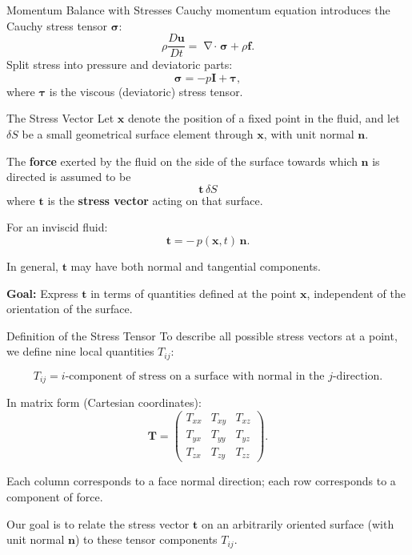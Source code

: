 \documentclass[aspectratio=169]{beamer}
\newcommand{\uu}{\bm{u}}
\newcommand{\I}{\mathbf{I}}
\DeclareMathOperator{\divg}{\nabla\!\cdot}
\begin{document}
\begin{frame}{Momentum Balance with Stresses}
Cauchy momentum equation introduces the Cauchy stress tensor $\bm{\sigma}$:
\[
\rho \frac{D\uu}{Dt} = \divg \bm{\sigma} + \rho \bm{f}.
\]
Split stress into pressure and deviatoric parts:
\[
\bm{\sigma} = -p \I + \bm{\tau},
\]
where $\bm{\tau}$ is the viscous (deviatoric) stress tensor.
\end{frame}


\begin{frame}{The Stress Vector}
\small
Let $\bm{x}$ denote the position of a fixed point in the fluid,
and let $\delta S$ be a small geometrical surface element through $\bm{x}$,
with unit normal $\bm{n}$.

\vspace{0.4cm}

The \textbf{force} exerted by the fluid on the side of the surface
towards which $\bm{n}$ is directed is assumed to be
\[
\boxed{\;\bm{t}\,\delta S\;}
\]
where $\bm{t}$ is the \textbf{stress vector} acting on that surface.

\vspace{0.4cm}

For an inviscid fluid:
\[
\bm{t} = -\,p(\bm{x},t)\,\bm{n}.
\]

In general, $\bm{t}$ may have both normal and tangential components.

\vspace{0.3cm}
\textbf{Goal:} Express $\bm{t}$ in terms of quantities defined at the point $\bm{x}$,
independent of the orientation of the surface.
\end{frame}
\begin{frame}{Definition of the Stress Tensor}
\small
To describe all possible stress vectors at a point,
we define nine local quantities $T_{ij}$:

\vspace{0.3cm}

\[
\boxed{\;
T_{ij} = \text{$i$-component of stress on a surface with normal in the $j$-direction.}
\;}
\]

\vspace{0.3cm}

In matrix form (Cartesian coordinates):
\[
\bm{T} =
\begin{pmatrix}
T_{xx} & T_{xy} & T_{xz}\\
T_{yx} & T_{yy} & T_{yz}\\
T_{zx} & T_{zy} & T_{zz}
\end{pmatrix}.
\]

Each column corresponds to a face normal direction;
each row corresponds to a component of force.

\vspace{0.4cm}

Our goal is to relate the stress vector $\bm{t}$ on an arbitrarily oriented
surface (with unit normal $\bm{n}$) to these tensor components $T_{ij}$.
\end{frame}
\end{document}
